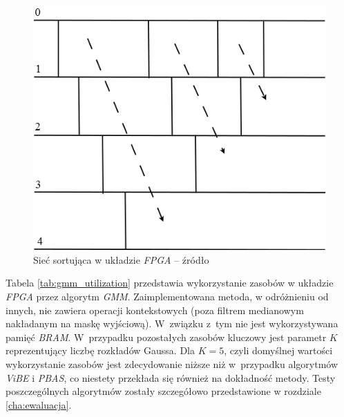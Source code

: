 	\begin{figure}[h!]
		\centering
		\includegraphics[scale=0.4]{img/4/sort_module.png}
		\caption{Sieć sortująca w układzie \textit{FPGA} -- źródło \cite{piszczek_15}}
		\label{fig:gmm_sort}
	\end{figure}	


Tabela \ref{tab:gmm_utilization} przedstawia wykorzystanie zasobów w układzie \textit{FPGA} przez algorytm \textit{GMM}. 
Zaimplementowana metoda, w odróżnieniu od innych, nie zawiera operacji kontekstowych (poza filtrem medianowym nakładanym na maskę wyjściową). W~związku z~tym nie jest wykorzystywana pamięć \textit{BRAM}. 
W~przypadku pozostałych zasobów kluczowy jest parametr $K$ reprezentujący liczbę rozkładów Gaussa. 
Dla $K=5$, czyli domyślnej wartości wykorzystanie zasobów jest zdecydowanie niższe niż w~przypadku algorytmów \textit{ViBE} i \textit{PBAS}, co niestety przekłada się również na dokładność metody. 
Testy poszczególnych algorytmów zostały szczegółowo przedstawione w rozdziale \ref{cha:ewaluacja}.

